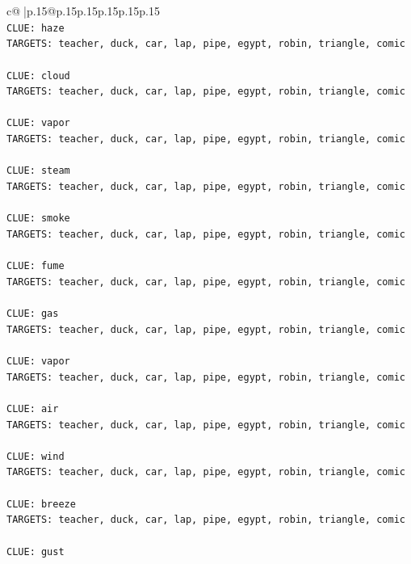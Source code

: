\documentclass{article}
\begin{document}
{\begin{supertabular}{c@{$\;$}|p{.15\linewidth}@{}p{.15\linewidth}p{.15\linewidth}p{.15\linewidth}p{.15\linewidth}p{.15\linewidth}}
{{{\\ 
\texttt{CLUE: haze} \\
\texttt{TARGETS: teacher, duck, car, lap, pipe, egypt, robin, triangle, comic} \\
\\ 
\texttt{CLUE: cloud} \\
\texttt{TARGETS: teacher, duck, car, lap, pipe, egypt, robin, triangle, comic} \\
\\ 
\texttt{CLUE: vapor} \\
\texttt{TARGETS: teacher, duck, car, lap, pipe, egypt, robin, triangle, comic} \\
\\ 
\texttt{CLUE: steam} \\
\texttt{TARGETS: teacher, duck, car, lap, pipe, egypt, robin, triangle, comic} \\
\\ 
\texttt{CLUE: smoke} \\
\texttt{TARGETS: teacher, duck, car, lap, pipe, egypt, robin, triangle, comic} \\
\\ 
\texttt{CLUE: fume} \\
\texttt{TARGETS: teacher, duck, car, lap, pipe, egypt, robin, triangle, comic} \\
\\ 
\texttt{CLUE: gas} \\
\texttt{TARGETS: teacher, duck, car, lap, pipe, egypt, robin, triangle, comic} \\
\\ 
\texttt{CLUE: vapor} \\
\texttt{TARGETS: teacher, duck, car, lap, pipe, egypt, robin, triangle, comic} \\
\\ 
\texttt{CLUE: air} \\
\texttt{TARGETS: teacher, duck, car, lap, pipe, egypt, robin, triangle, comic} \\
\\ 
\texttt{CLUE: wind} \\
\texttt{TARGETS: teacher, duck, car, lap, pipe, egypt, robin, triangle, comic} \\
\\ 
\texttt{CLUE: breeze} \\
\texttt{TARGETS: teacher, duck, car, lap, pipe, egypt, robin, triangle, comic} \\
\\ 
\texttt{CLUE: gust} \\
}}}
\end{supertabular}}
\end{document}
